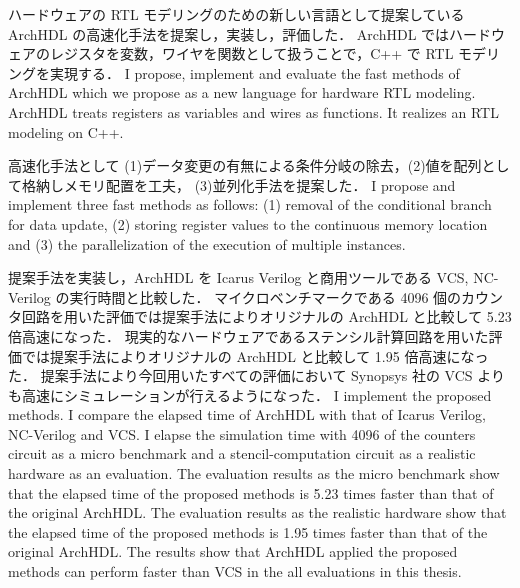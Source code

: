 ハードウェアの RTL モデリングのための新しい言語として提案している ArchHDL の高速化手法を提案し，実装し，評価した．
ArchHDL ではハードウェアのレジスタを変数，ワイヤを関数として扱うことで，C++ で RTL モデリングを実現する．
\fi
I propose, implement and evaluate the fast methods of ArchHDL which we propose as a new language for hardware RTL modeling.
ArchHDL treats registers as variables and wires as functions.
It realizes an RTL modeling on C++.

高速化手法として (1)データ変更の有無による条件分岐の除去，(2)値を配列として格納しメモリ配置を工夫，
(3)並列化手法を提案した．
\fi
I propose and implement three fast methods as follows:
(1) removal of the conditional branch for data update,
(2) storing register values to the continuous memory location
and (3) the parallelization of the execution of multiple instances.

提案手法を実装し，ArchHDL を Icarus Verilog と商用ツールである VCS, NC-Verilog の実行時間と比較した．
マイクロベンチマークである 4096 個のカウンタ回路を用いた評価では提案手法によりオリジナルの ArchHDL と比較して 5.23 倍高速になった．
現実的なハードウェアであるステンシル計算回路を用いた評価では提案手法によりオリジナルの ArchHDL と比較して 1.95 倍高速になった．
提案手法により今回用いたすべての評価において Synopsys 社の VCS よりも高速にシミュレーションが行えるようになった．
\fi
I implement the proposed methods.
I compare the elapsed time of ArchHDL with that of Icarus Verilog, NC-Verilog and VCS.
I elapse the simulation time with 4096 of the counters circuit as a micro benchmark and a stencil-computation circuit as a realistic hardware as an evaluation.
The evaluation results as the micro benchmark show that the elapsed time of the proposed methods is 5.23 times faster than that of the original ArchHDL.
The evaluation results as the realistic hardware show that the elapsed time of the proposed methods is 1.95 times faster than that of the original ArchHDL.
The results show that ArchHDL applied the proposed methods can perform faster than VCS in the all evaluations in this thesis.
